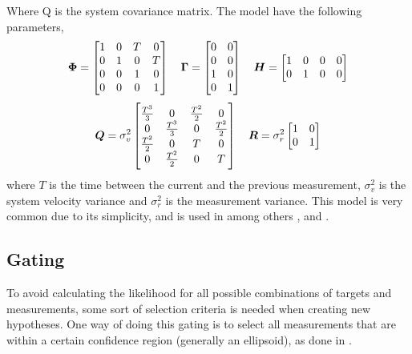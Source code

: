 Where Q is the system covariance matrix. The model have the following parameters,
\begin{equation*}
\bm{\Phi} =	\begin{bmatrix}
1 & 0 & T & 0 \\
0 & 1 & 0 & T \\
0 & 0 & 1 & 0 \\
0 & 0 & 0 & 1 \\
\end{bmatrix} \quad
\bm{\Gamma} = \begin{bmatrix}
0 & 0 \\
0 & 0 \\
1 & 0 \\
0 & 1 \\
\end{bmatrix} \quad
\bm{H} = \begin{bmatrix}
1 & 0 & 0 & 0 \\
0 & 1 & 0 & 0 \\
\end{bmatrix}
\end{equation*}
\begin{equation*}
\bm{Q}	= \sigma_v^2 \begin{bmatrix}
\frac{T^3}{3} 	& 0 				& \frac{T^2}{2}	& 0 			\\
0 				& \frac{T^3}{3}  	& 0 			& \frac{T^2}{2}	\\
\frac{T^2}{2}	& 0					& T				& 0				\\
0				& \frac{T^2}{2}		& 0				& T				\\
\end{bmatrix} \quad
\bm{R} = \sigma_r^2 \begin{bmatrix}
1 & 0 \\
0 & 1 \\
\end{bmatrix}
\end{equation*}
where $T$ is the time between the current and the previous measurement, $\sigma_v^2$ is the system velocity variance and $\sigma_r^2$ is the measurement variance. This model is very common due to its simplicity, and is used in among others \cite{Reid1978}, \cite{Coraluppi2000} and \cite{Brekke2012}.

\subsection{Gating}
To avoid calculating the likelihood for all possible combinations of targets and measurements, some sort of selection criteria is needed when creating new hypotheses. One way of doing this gating is to select all measurements that are within a certain confidence region (generally an ellipsoid), as done in \cite{Reid1978}.

